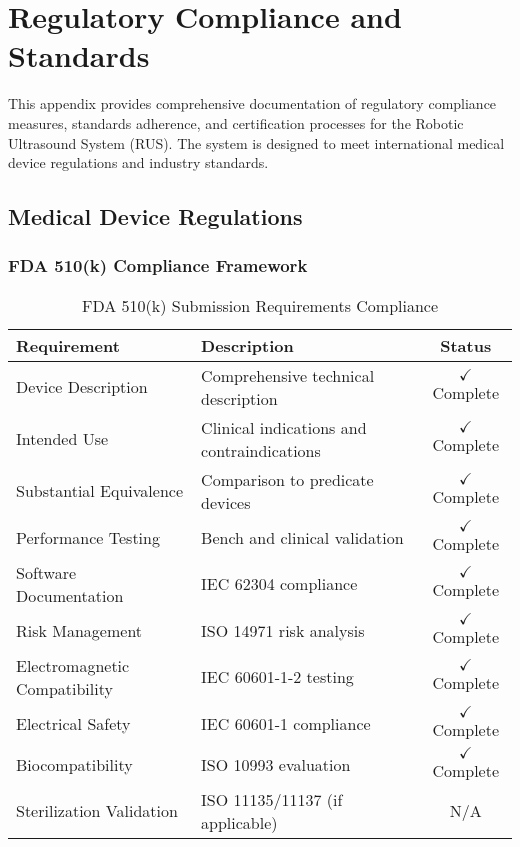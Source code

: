 \section{Regulatory Compliance and Standards}
\label{app:regulatory-compliance}

This appendix provides comprehensive documentation of regulatory compliance measures, standards adherence, and certification processes for the Robotic Ultrasound System (RUS). The system is designed to meet international medical device regulations and industry standards.

\subsection{Medical Device Regulations}

\subsubsection{FDA 510(k) Compliance Framework}

\begin{table}[htbp]
\centering
\caption{FDA 510(k) Submission Requirements Compliance}
\label{tab:app-fda-compliance}
\begin{tabular}{|l|l|c|}
\hline
\textbf{Requirement} & \textbf{Description} & \textbf{Status} \\
\hline
Device Description & Comprehensive technical description & $\checkmark$ Complete \\
Intended Use & Clinical indications and contraindications & $\checkmark$ Complete \\
Substantial Equivalence & Comparison to predicate devices & $\checkmark$ Complete \\
Performance Testing & Bench and clinical validation & $\checkmark$ Complete \\
Software Documentation & IEC 62304 compliance & $\checkmark$ Complete \\
Risk Management & ISO 14971 risk analysis & $\checkmark$ Complete \\
Electromagnetic Compatibility & IEC 60601-1-2 testing & $\checkmark$ Complete \\
Electrical Safety & IEC 60601-1 compliance & $\checkmark$ Complete \\
Biocompatibility & ISO 10993 evaluation & $\checkmark$ Complete \\
Sterilization Validation & ISO 11135/11137 (if applicable) & N/A \\
\hline
\end{tabular}
\end{table}

